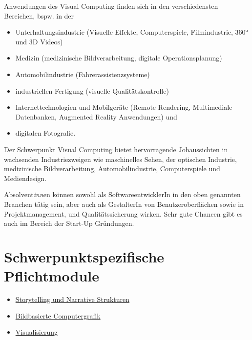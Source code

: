 Anwendungen des Visual Computing finden sich in den verschiedensten
Bereichen, bspw. in der

\begin{itemize}
\tightlist
\item
  Unterhaltungsindustrie (Visuelle Effekte, Computerspiele,
  Filmindustrie, 360° und 3D Videos)
\item
  Medizin (medizinische Bildverarbeitung, digitale Operationsplanung)
\item
  Automobilindustrie (Fahrerassistenzsysteme)
\item
  industriellen Fertigung (visuelle Qualitätskontrolle)
\item
  Internettechnologien und Mobilgeräte (Remote Rendering, Multimediale
  Datenbanken, Augmented Reality Anwendungen) und
\item
  digitalen Fotografie.
\end{itemize}

Der Schwerpunkt Visual Computing bietet hervorragende Jobaussichten in
wachsenden Industriezweigen wie maschinelles Sehen, der optischen
Industrie, medizinische Bildverarbeitung, Automobilindustrie,
Computerspiele und Mediendesign.

Absolvent\emph{inn}en können sowohl als SoftwareentwicklerIn in den oben
genannten Branchen tätig sein, aber auch als GestalterIn von
Benutzeroberflächen sowie in Projektmanagement, und Qualitätssicherung
wirken. Sehr gute Chancen gibt es auch im Bereich der Start-Up
Gründungen.

\section*{Schwerpunktspezifische
Pflichtmodule\label{/mi-2017/modulbeschreibungen-master/schwerpunkt-visual-computing}}\label{schwerpunktspezifische-pflichtmodulepathlabelmi-2017modulbeschreibungen-masterschwerpunkt-visual-computing}

\begin{itemize}
\tightlist
\item
  \hyperref[/mi-2017/modulbeschreibungen-master/MA_VC_Modul_Storytelling]{Storytelling
  und Narrative Strukturen}
\item
  \hyperref[/mi-2017/modulbeschreibungen-master/MA_VC_Modul_BildbasierteComputergrafik]{Bildbasierte
  Computergrafik}
\item
  \hyperref[/mi-2017/modulbeschreibungen-master/MA_VC_Modul_Visualisierung]{Visualisierung}
\end{itemize}

